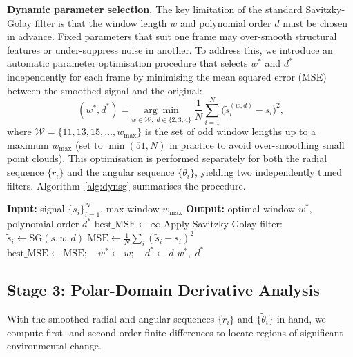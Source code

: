 \documentclass[lettersize,journal]{IEEEtran}
\begin{document}
\textbf{Dynamic parameter selection.} The key limitation of the standard
Savitzky-Golay filter is that the window length $w$ and polynomial order $d$
must be chosen in advance. Fixed parameters that suit one frame may over-smooth
structural features or under-suppress noise in another. To address this, we
introduce an automatic parameter optimisation procedure that selects $w^*$ and
$d^*$ independently for each frame by minimising the mean squared error (MSE)
between the smoothed signal and the original:
\begin{equation}
  (w^*, d^*) = \underset{w \in \mathcal{W},\; d \in \{2,3,4\}}{\arg\min}\;
  \frac{1}{N} \sum_{i=1}^{N} \bigl(\tilde{s}_i^{(w,d)} - s_i\bigr)^2,
  \label{eq:dynparam}
\end{equation}
where $\mathcal{W} = \{11, 13, 15, \ldots, w_{\max}\}$ is the set of odd window
lengths up to a maximum $w_{\max}$ (set to $\min(51, N)$ in practice to avoid
over-smoothing small point clouds). This optimisation is performed separately
for both the radial sequence $\{r_i\}$ and the angular sequence $\{\theta_i\}$,
yielding two independently tuned filters. Algorithm~\ref{alg:dynsg} summarises
the procedure.

\begin{algorithm}[!t]
\caption{Dynamic Savitzky-Golay Parameter Selection}
\label{alg:dynsg}
\begin{algorithmic}
\STATE \textbf{Input:} signal $\{s_i\}_{i=1}^{N}$, max window $w_{\max}$
\STATE \textbf{Output:} optimal window $w^*$, polynomial order $d^*$
\STATE $\text{best\_MSE} \leftarrow \infty$
    \STATE Apply Savitzky-Golay filter: $\tilde{s}_i \leftarrow \text{SG}(s, w, d)$
    \STATE $\text{MSE} \leftarrow \frac{1}{N}\sum_i (\tilde{s}_i - s_i)^2$
      \STATE $\text{best\_MSE} \leftarrow \text{MSE};\quad w^* \leftarrow w;\quad d^* \leftarrow d$
    \ENDIF
  \ENDFOR
\ENDFOR
\RETURN $w^*,\; d^*$
\end{algorithmic}
\end{algorithm}

\subsection{Stage 3: Polar-Domain Derivative Analysis}

With the smoothed radial and angular sequences $\{\tilde{r}_i\}$ and
$\{\tilde{\theta}_i\}$ in hand, we compute first- and second-order finite
differences to locate regions of significant environmental change.
\end{document}

